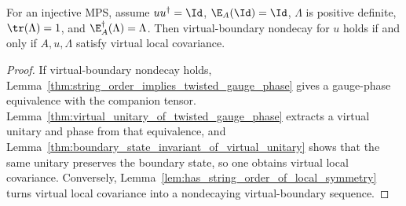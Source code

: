 \begin{lemma}%
    \label{thm:string_order_iff_local_symmetry}
    \leanok
    For an injective MPS, assume $u u^\dagger = \Id$,
    $\E_A(\Id)=\Id$, $\Lambda$ is positive definite,
    $\tr(\Lambda)=1$, and $\E_A^\dagger(\Lambda)=\Lambda$. Then
    virtual-boundary nondecay for $u$ holds if and only if $A,u,\Lambda$
    satisfy virtual local covariance.
\end{lemma}

\begin{proof}
    \leanok
    If virtual-boundary nondecay holds,
    Lemma~\ref{thm:string_order_implies_twisted_gauge_phase} gives a
    gauge-phase equivalence with the companion tensor.
    Lemma~\ref{thm:virtual_unitary_of_twisted_gauge_phase} extracts a virtual
    unitary and phase from that equivalence, and
    Lemma~\ref{thm:boundary_state_invariant_of_virtual_unitary} shows that the
    same unitary preserves the boundary state, so one obtains virtual local
    covariance. Conversely, Lemma~\ref{lem:has_string_order_of_local_symmetry}
    turns virtual local covariance into a nondecaying virtual-boundary sequence.
\end{proof}

